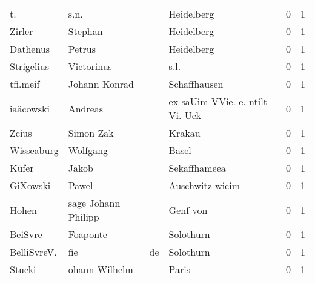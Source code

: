 \begin{center}
\begin{tiny}
\begin{longtabu}{llllrr}
                       t. &                               s.n. &             &                                  Heidelberg &          0 &         1 \\
                   Zirler &                            Stephan &             &                                  Heidelberg &          0 &         1 \\
                 Dathenus &                             Petrus &             &                                  Heidelberg &          0 &         1 \\
               Strigelius &                         Victorinus &             &                                        s.l. &          0 &         1 \\
                 tfi.meif &                      Johann Konrad &             &                                Schaffhausen &          0 &         1 \\
                iaäcowski &                            Andreas &             &             ex saUim VVie. e. ntilt Vi. Uck &          0 &         1 \\
                    Zcius &                          Simon Zak &             &                                      Krakau &          0 &         1 \\
               Wisseaburg &                           Wolfgang &             &                                       Basel &          0 &         1 \\
                    Küfer &                              Jakob &             &                                Sekaffhameea &          0 &         1 \\
                 GiXowski &                              Pawel &             &                             Auschwitz wicim &          0 &         1 \\
                    Hohen &                sage Johann Philipp &             &                                    Genf von &          0 &         1 \\
                  BeiSvre &                           Foaponte &             &                                   Solothurn &          0 &         1 \\
              BelliSvreV. &                                fie &          de &                                   Solothurn &          0 &         1 \\
                   Stucki &                      ohann Wilhelm &             &                                       Paris &          0 &         1 \\

\end{longtabu}
\end{tiny}
\end{center}
